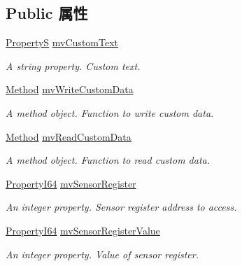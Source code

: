 \subsection*{Public 属性}
\begin{DoxyCompactItemize}
\item 
\hyperlink{classmv_i_m_p_a_c_t_1_1acquire_1_1_property_s}{Property\+S} \hyperlink{classmv_i_m_p_a_c_t_1_1acquire_1_1_gen_i_cam_1_1mv_custom_data_ae8420def2ef3798241e6b6a2c0cecd6a}{mv\+Custom\+Text}
\begin{DoxyCompactList}\small\item\em A string property. Custom text. \end{DoxyCompactList}\item 
\hyperlink{classmv_i_m_p_a_c_t_1_1acquire_1_1_method}{Method} \hyperlink{classmv_i_m_p_a_c_t_1_1acquire_1_1_gen_i_cam_1_1mv_custom_data_ad1b5ff8323b05b7e0c9a61bb5ca18059}{mv\+Write\+Custom\+Data}
\begin{DoxyCompactList}\small\item\em A method object. Function to write custom data. \end{DoxyCompactList}\item 
\hyperlink{classmv_i_m_p_a_c_t_1_1acquire_1_1_method}{Method} \hyperlink{classmv_i_m_p_a_c_t_1_1acquire_1_1_gen_i_cam_1_1mv_custom_data_aaf2e51ca7c1b6156e20d29e48f3756ac}{mv\+Read\+Custom\+Data}
\begin{DoxyCompactList}\small\item\em A method object. Function to read custom data. \end{DoxyCompactList}\item 
\hyperlink{group___common_interface_ga81749b2696755513663492664a18a893}{Property\+I64} \hyperlink{classmv_i_m_p_a_c_t_1_1acquire_1_1_gen_i_cam_1_1mv_custom_data_a31b1d2f799dc6d28af8fd3364a2a36b8}{mv\+Sensor\+Register}
\begin{DoxyCompactList}\small\item\em An integer property. Sensor register address to access. \end{DoxyCompactList}\item 
\hyperlink{group___common_interface_ga81749b2696755513663492664a18a893}{Property\+I64} \hyperlink{classmv_i_m_p_a_c_t_1_1acquire_1_1_gen_i_cam_1_1mv_custom_data_ad83955ee9f0f3a7d79d5ca5eebd09962}{mv\+Sensor\+Register\+Value}
\begin{DoxyCompactList}\small\item\em An integer property. Value of sensor register. \end{DoxyCompactList}\item 

\end{DoxyCompactItemize}
